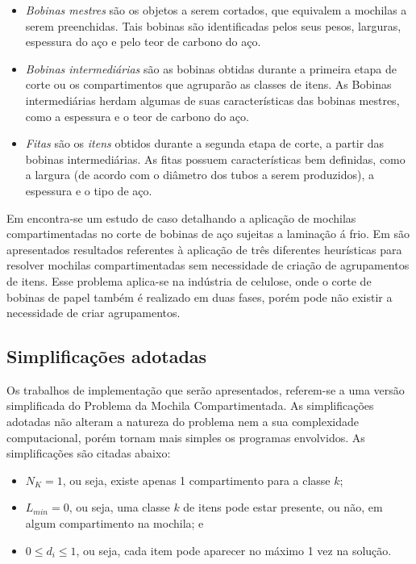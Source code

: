 \begin{itemize}
 \item \textit{Bobinas mestres} são os objetos a serem cortados, que equivalem a mochilas a serem preenchidas. Tais bobinas são identificadas pelos seus pesos, larguras, espessura do aço e pelo teor de carbono do aço.
	\item \textit{Bobinas intermediárias} são as bobinas obtidas durante a primeira etapa de corte ou os compartimentos que agruparão as classes de itens. As Bobinas intermediárias herdam algumas de suas características das bobinas mestres, como a espessura e o teor de carbono do aço.
	\item \textit{Fitas} são os \textit{itens} obtidos durante a segunda etapa de corte, a partir das bobinas intermediárias. As fitas possuem características bem definidas, como a largura (de acordo com o diâmetro dos tubos a serem produzidos), a espessura e o tipo de aço.
\end{itemize}

Em \cite{HOTO03} encontra-se um estudo de caso detalhando a aplicação de mochilas compartimentadas no corte de bobinas de aço sujeitas a laminação á frio. Em \cite{HOTO05} são apresentados resultados referentes à aplicação de três diferentes heurísticas para resolver mochilas compartimentadas sem necessidade de criação de agrupamentos de itens. Esse problema aplica-se na indústria de celulose, onde o corte de bobinas de papel também é realizado em duas fases, porém pode não existir a necessidade de criar agrupamentos. 

\subsection{Simplificações adotadas}

Os trabalhos de implementação que serão apresentados, referem-se a uma versão simplificada do Problema da Mochila Compartimentada. As simplificações adotadas não alteram a natureza do problema nem a sua complexidade computacional, porém tornam mais simples os programas envolvidos. As simplificações são citadas abaixo:

\begin{itemize}
	\item $N_K=1$, ou seja, existe apenas 1 compartimento para a classe $k$;
	\item $L_{min}=0$, ou seja, uma classe $k$ de itens pode estar presente, ou não, em algum compartimento na mochila; e
	\item $0 \leq d_i \leq 1$, ou seja, cada item pode aparecer no máximo 1 vez na solução.
\end{itemize}

